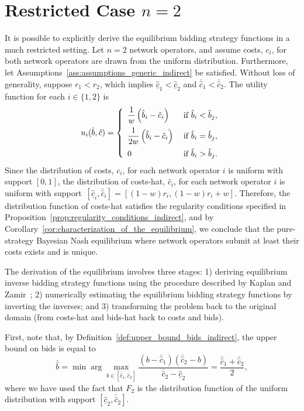 \section{Restricted Case $n=2$} %
\label{sec:restricted_case_n_2_indirect}
It is possible to explicitly derive the equilibrium bidding strategy functions in a much restricted setting. Let $n=2$ network operators, and assume costs, $c_i$, for both network operators are drawn from the uniform distribution. Furthermore, let Assumptions~\ref{ass:assumptions_generic_indirect} be satisfied. Without loss of generality, suppose $r_1 < r_2$, which implies $\underline{\hat{c}}_1 < \underline{\hat{c}}_2$ and $\bar{\hat{c}}_1 < 
\bar{\hat{c}}_2$. The utility function for each $i\in \{1,2\}$ is
\begin{equation*}
  u_i(\hat{b},\hat{c}) = \left\{
  \begin{array}{l l}
    \displaystyle\frac{1}{w}\left(\hat{b}_i-\hat{c}_i\right) & \;\text{if } \hat{b}_i < \hat{b}_j,\\[2ex]
    \displaystyle\frac{1}{2w}\left(\hat{b}_i-\hat{c}_i\right) & \;\text{if } \hat{b}_i = \hat{b}_j,\\[2ex]
    0 & \;\text{if } \hat{b}_i > \hat{b}_j.
  \end{array}\right.
\end{equation*}
Since the distribution of costs, $c_i$, for each network operator $i$ is uniform with support $[0,1]$, the distribution of costs-hat, $\hat{c}_i$, for each network operator $i$ is uniform with support~${[\underline{\hat{c}}_i, \bar{\hat{c}}_i]} = {[(1-w)r_i, (1-w)r_i + w]}$. Therefore, the distribution function of costs-hat satisfies the regularity conditions specified in Proposition~\ref{prop:regularity_conditions_indirect}, and by Corollary~\ref{cor:characterization_of_the_equilibrium}, we conclude that the pure-strategy Bayesian Nash equilibrium where network operators submit at least their costs exists and is unique.

The derivation of the equilibrium involves three stages: 1) deriving equilibrium inverse bidding strategy functions using the procedure described by Kaplan and Zamir~\cite{KaplanZamir2007}; 2) numerically estimating the equilibrium bidding strategy functions by inverting the inverses; and 3) transforming the problem back to the original domain (from costs-hat and bids-hat back to costs and bids).

First, note that, by Definition~\ref{def:upper_bound_bids_indirect}, the upper bound on bids is equal to
\begin{equation}
  \label{eq:upper_bound_bids_restricted_indirect}
  \bar{\hat{b}} = \min\arg\max_{b\in[\bar{\hat{c}}_1, \bar{\hat{c}}_2]} \frac{(b - \bar{\hat{c}}_1)(\bar{\hat{c}}_2 - b)}{\bar{\hat{c}}_2 - \underline{\hat{c}}_2} = \frac{\bar{\hat{c}}_1 + \bar{\hat{c}}_2}{2},
\end{equation}
where we have used the fact that $F_2$ is the distribution function of the uniform distribution with support $[\underline{\hat{c}}_2, \bar{\hat{c}}_2]$.

